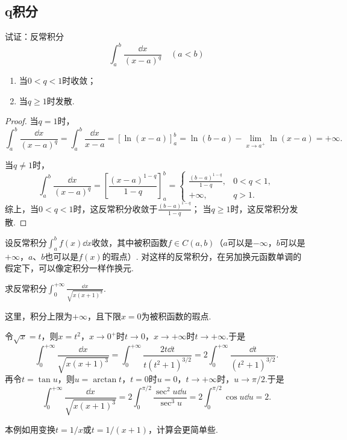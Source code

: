 \subsection{q积分}
\begin{example}[q积分]\label{example:定积分.q积分}
试证：反常积分\[
\int_a^b \frac{\dd{x}}{(x-a)^q} \quad(a<b)
\]\begin{enumerate}
\item 当\(0 < q < 1\)时收敛；
\item 当\(q \geqslant 1\)时发散.
\end{enumerate}
\begin{proof}
当\(q=1\)时，\[
\int_a^b \frac{\dd{x}}{(x-a)^q}
= \int_a^b \frac{\dd{x}}{x-a}
= [\ln(x-a)]_a^b
= \ln(b-a) - \lim\limits_{x \to a^+} \ln(x-a) = +\infty.
\]

\def\arraystretch{1.5}
当\(q\neq1\)时，\[
\int_a^b \frac{\dd{x}}{(x-a)^q}
= \left[ \frac{(x-a)^{1-q}}{1-q} \right]_a^b
= \left\{ \begin{array}{cc}
\frac{(b-a)^{1-q}}{1-q}, & 0<q<1, \\
+\infty, & q>1.
\end{array} \right.
\]
综上，当\(0<q<1\)时，这反常积分收敛于\(\frac{(b-a)^{1-q}}{1-q}\)；
当\(q\geqslant1\)时，这反常积分发散.
\end{proof}
\end{example}

设反常积分\(\int_a^b f(x) \dd{x}\)收敛，其中被积函数\(f \in C(a,b)\)（\(a\)可以是\(-\infty\)，\(b\)可以是\(+\infty\)，\(a\)、\(b\)也可以是\(f(x)\)的瑕点）.
对这样的反常积分，在另加换元函数单调的假定下，可以像定积分一样作换元.

\begin{example}
求反常积分\(\int_0^{+\infty} \frac{\dd{x}}{\sqrt{x(x+1)^3}}\).
\begin{solution}
这里，积分上限为\(+\infty\)，且下限\(x=0\)为被积函数的瑕点.

令\(\sqrt{x} = t\)，则\(x = t^2\)，\(x\to0^+\)时\(t\to0\)，\(x\to+\infty\)时\(t\to+\infty\).于是\[
\int_0^{+\infty} \frac{\dd{x}}{\sqrt{x(x+1)^3}}
= \int_0^{+\infty} \frac{2t\dd{t}}{t(t^2+1)^{3/2}}
= 2 \int_0^{+\infty} \frac{\dd{t}}{(t^2+1)^{3/2}}.
\]
再令\(t = \tan u\)，则\(u = \arctan t\)，\(t=0\)时\(u=0\)，\(t\to+\infty\)时，\(u\to\pi/2\).于是\[
\int_0^{+\infty} \frac{\dd{x}}{\sqrt{x(x+1)^3}}
= 2 \int_0^{\pi/2} \frac{\sec^2 u \dd{u}}{\sec^3 u}
= 2 \int_0^{\pi/2} \cos u \dd{u}
= 2.
\]
\end{solution}
本例如用变换\(t = 1/x\)或\(t = 1/(x+1)\)，计算会更简单些.
\end{example}

